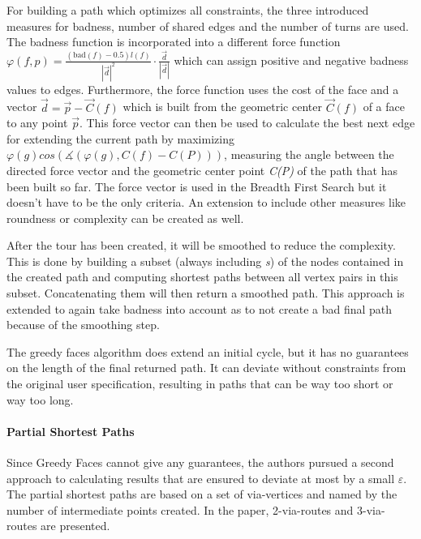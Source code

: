 For building a path which optimizes all constraints, the three introduced measures for badness, number of shared edges and the number of turns are used.
The badness function is incorporated into a different force function $\varphi (f,p) = \frac{(\text{bad}(f)-0.5)l(f)}{|\vec{d}|^2} \cdot \frac{\vec{d}}{|\vec{d}|}$ which can assign positive and negative badness values to edges.
Furthermore, the force function uses the cost of the face and a vector $\vec{d} = \vec{p} - \vec{C}(f)$ which is built from the geometric center $\vec{C}(f)$ of a face to any point $\vec{p}$. 
This force vector can then be used to calculate the best next edge for extending the current path by maximizing $\varphi(g) cos (\measuredangle (\varphi(g), C(f) - C(P)))$, measuring the angle between the directed force vector and the geometric center point \textit{C(P)} of the path that has been built so far.
The force vector is used in the Breadth First Search but it doesn't have to be the only criteria.
An extension to include other measures like roundness or complexity can be created as well. \cite{gemsa_efficient_2013}
 

After the tour has been created, it will be smoothed to reduce the complexity.
This is done by building a subset (always including \textit{s}) of the nodes contained in the created path and computing shortest paths between all vertex pairs in this subset. 
Concatenating them will then return a smoothed path.
This approach is extended to again take badness into account as to not create a bad final path because of the smoothing step. \cite{gemsa_efficient_2013}

The greedy faces algorithm does extend an initial cycle, but it has no guarantees on the length of the final returned path.
It can deviate without constraints from the original user specification, resulting in paths that can be way too short or way too long. \cite{gemsa_efficient_2013}


\paragraph{Partial Shortest Paths}

Since Greedy Faces cannot give any guarantees, the authors pursued a second approach to calculating results that are ensured to deviate at most by a small $\varepsilon$.
The partial shortest paths are based on a set of via-vertices and named by the number of intermediate points created. 
In the paper, 2-via-routes and 3-via-routes are presented.

